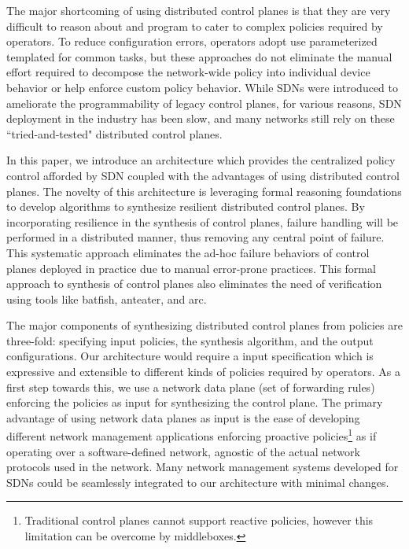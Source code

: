 The major shortcoming of using distributed control planes is that
they are very difficult to reason about and program to cater to 
complex policies required by operators. To reduce configuration 
errors, operators adopt use parameterized templated for common
tasks, but these approaches do not eliminate the manual effort
required to decompose the network-wide policy into individual device
behavior or help enforce custom policy behavior. While SDNs 
were introduced to ameliorate the programmability of legacy control planes, 
for various reasons, 
SDN deployment in the industry has been slow, and many 
networks still rely on these ``tried-and-tested" distributed 
control planes. 



In this paper, we introduce an architecture which provides the centralized
policy control afforded by SDN coupled with the advantages of using
distributed control planes. The novelty of this architecture is leveraging
formal reasoning foundations to develop algorithms to 
synthesize resilient distributed control planes. 
By incorporating resilience in the synthesis of 
control planes, failure handling will be 
performed in a distributed manner, thus removing any central point 
of failure. This systematic approach eliminates the ad-hoc failure behaviors of
control planes deployed in practice due to manual error-prone practices. This
formal approach to synthesis of control planes also eliminates the need of 
verification using tools like batfish, anteater, and arc. 

The major components of synthesizing distributed control planes from 
policies are three-fold: specifying input policies, the synthesis 
algorithm, and the output configurations.
Our architecture would require a input specification which is expressive 
and extensible to different kinds of policies required by operators. As a 
first step towards this, we use a network data plane (set of forwarding rules)
enforcing the policies as input for synthesizing the control plane. The primary 
advantage of using network data planes as input is the ease of developing
different network management applications enforcing proactive policies\footnote{
Traditional control planes cannot support reactive policies, however
this limitation can be overcome by middleboxes.} 
as if operating over a software-defined
network, agnostic of the actual network protocols used in the network. 
Many network management systems developed for SDNs could be seamlessly
integrated to our architecture with minimal changes. 

